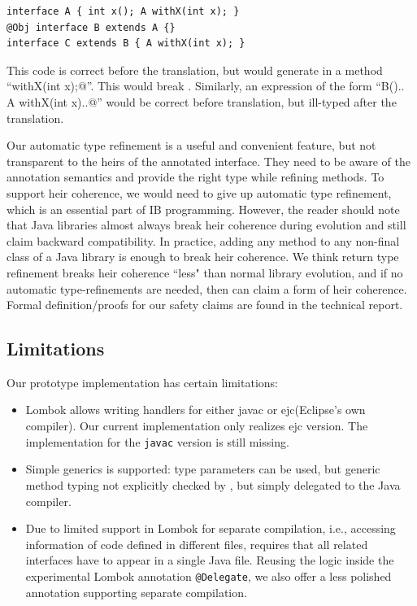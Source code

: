 \begin{lstlisting}
interface A { int x(); A withX(int x); }
@Obj interface B extends A {}
interface C extends B { A withX(int x); }
\end{lstlisting}

\noindent This code is correct before the translation, but \mixin would  generate in \Q@B@  a method ``\Q@B withX(int x);@''.
This would break \Q@C@.
Similarly, an expression of the form ``\Q@new B(){.. A withX(int x){..}}@''
would be correct before translation, but ill-typed after the translation.

Our automatic type refinement is a useful and convenient feature, but
not transparent to the heirs of the annotated interface.  They need to
be aware of the annotation semantics and provide the right type while
refining methods. To support heir coherence, we would need
to give up automatic type refinement, which is an essential part of IB programming.
However, the reader should note that Java libraries almost always break heir
coherence during evolution and still claim backward compatibility. In practice, adding any method to any
non-final class of a Java library is enough to break heir
coherence.  We think return type refinement breaks heir coherence ``less" than normal library evolution, and
if no automatic type-refinements are needed, then \mixin can claim a
form of heir coherence.
Formal definition/proofs for our safety claims are found in the
technical report.

\subsection{Limitations}
Our prototype implementation has certain limitations:
\begin{itemize}
\item Lombok allows writing handlers for either javac or ejc(Eclipse's own compiler).
Our current implementation only realizes ejc version. The implementation for
  the \texttt{javac} version is still missing.
\item Simple generics is supported:
type parameters can be used, but generic
method typing %
not explicitly checked by \mixin, but simply delegated to the Java compiler.
\item 
Due to limited support in Lombok for separate compilation, i.e., 
accessing information of code defined in different files, \mixin 
requires that all
  related interfaces have to appear in a single Java file.
Reusing the logic inside the experimental Lombok annotation \lstinline{@Delegate},
we also offer a less polished annotation supporting
separate compilation.
\end{itemize}


